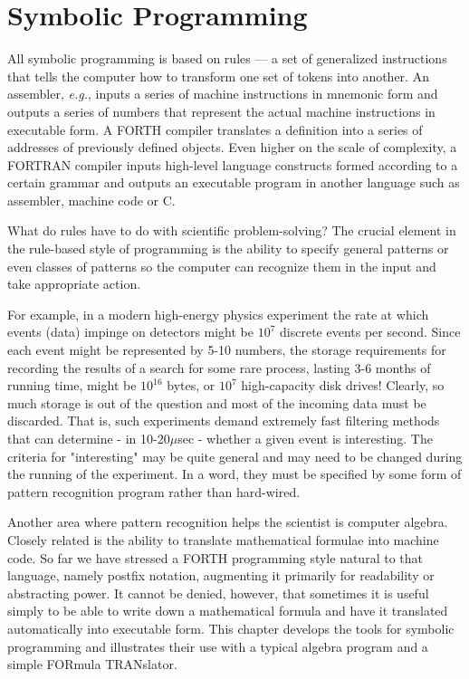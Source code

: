 
\chapter{Symbolic Programming}

All symbolic programming is based on rules --- a set of generalized instructions that tells the computer how to transform one set of tokens into another. An assembler, \textit{e.g.}, inputs a series of machine instructions in mnemonic form and outputs a series of numbers that represent the actual machine instructions in executable form. A FORTH compiler translates a definition into a series of addresses of previously defined objects. Even higher on the scale of complexity, a FORTRAN compiler inputs high-level language constructs formed according to a certain grammar and outputs an executable program in another language such as assembler, machine code or C.

What do rules have to do with scientific problem-solving? The crucial element in the rule-based style of programming is the ability to specify general patterns or even classes of patterns so the computer can recognize them in the input and take appropriate action.

For example, in a modern high-energy physics experiment the rate at which events (data) impinge on detectors might be $10^{7}$ discrete events per second. Since each event might be represented by 5-10 numbers, the storage requirements for recording the results of a search for some rare process, lasting 3-6 months of running time, might be $10^16$ bytes, or $10^7$ high-capacity disk drives! Clearly, so much storage is out of the question and most of the incoming data must be discarded. That is, such experiments demand extremely fast filtering methods that can determine - in 10-20$\mu$sec - whether a given event is interesting. The criteria for "interesting" may be quite general and may need to be changed during the running of the experiment. In a word, they must be specified by some form of pattern recognition program rather than hard-wired.

Another area where pattern recognition helps the scientist is computer algebra. Closely related is the ability to translate mathematical formulae into machine code. So far we have stressed a FORTH programming style natural to that language, namely postfix notation, augmenting it primarily for readability or abstracting power. It cannot be denied, however, that sometimes it is useful simply to be able to write down a mathematical formula and have it translated automatically into executable form. This chapter develops the tools for symbolic programming and illustrates their use with a typical algebra program and a simple FORmula TRANslator.


